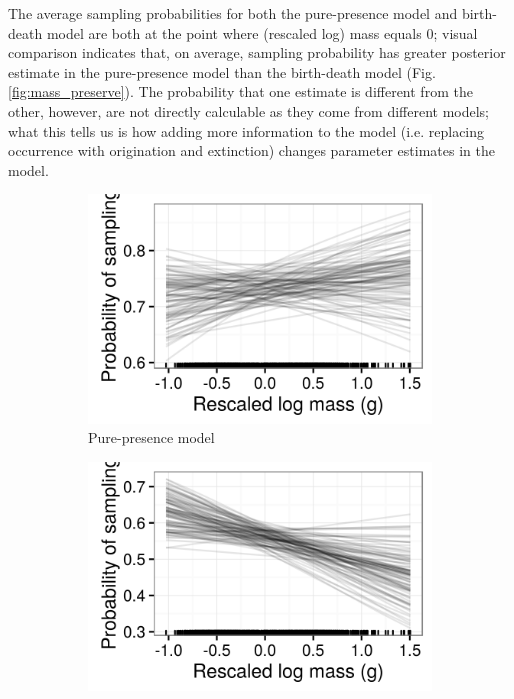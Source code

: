 \documentclass[12pt,letterpaper]{article}
\begin{document}
The average sampling probabilities for both the pure-presence model and birth-death model are both at the point where (rescaled log) mass equals 0; visual comparison indicates that, on average, sampling probability has greater posterior estimate in the pure-presence model than the birth-death model (Fig.\ref{fig:mass_preserve}). The probability that one estimate is different from the other, however, are not directly calculable as they come from different models; what this tells us is how adding more information to the model (i.e. replacing occurrence with origination and extinction) changes parameter estimates in the model.

\begin{figure}[ht]
  \begin{subfigure}[b]{0.45\textwidth}
    \includegraphics[width=\textwidth,height=0.4\textheight,keepaspectratio=true]{figure/mass_on_samp}
    \caption{Pure-presence model}
    \label{fig:mass_preserve_pure_pres}
  \end{subfigure}
  \begin{subfigure}[b]{0.45\textwidth}
    \includegraphics[width=\textwidth,height=0.4\textheight,keepaspectratio=true]{figure/mass_on_samp_bd}

\end{subfigure}
\end{figure}
\end{document}
